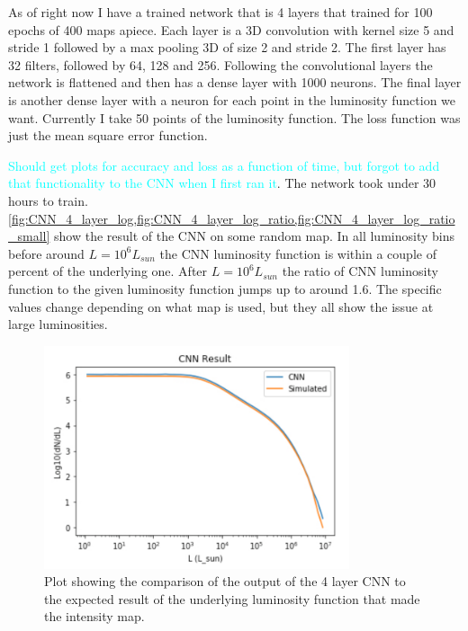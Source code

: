 \documentclass{article}
\newcommand{\dnp}[1]{\textcolor{cyan}{#1}}
\begin{document}
			As of right now I have a trained network that is 4 layers that trained for 100 epochs of 400 maps apiece.  Each layer is a 3D convolution with kernel size 5 and stride 1 followed by a max pooling 3D of size 2 and stride 2.  The first layer has 32 filters, followed by 64, 128 and 256.  Following the convolutional layers the network is flattened and then has a dense layer with 1000 neurons.  The final layer is another dense layer with a neuron for each point in the luminosity function we want.  Currently I take 50 points of the luminosity function.  The loss function was just the mean square error function.

			\dnp{Should get plots for accuracy and loss as a function of time, but forgot to add that functionality to the CNN when I first ran it}.  The network took under 30 hours to train.  \cref{fig:CNN_4_layer_log,fig:CNN_4_layer_log_ratio,fig:CNN_4_layer_log_ratio_small} show the result of the CNN on some random map.  In all luminosity bins before around \(L = 10^6 L_{sun}\) the CNN luminosity function is within a couple of percent of the underlying one.  After \(L = 10^6 L_{sun}\) the ratio of CNN luminosity function to the given luminosity function jumps up to around 1.6.  The specific values change depending on what map is used, but they all show the issue at large luminosities.

			\begin{figure}[H]
				\centering 
				\includegraphics[width=0.8\textwidth]{CNN_4_layer_log.pdf}
				\caption{Plot showing the comparison of the output of the 4 layer CNN to the expected result of the underlying luminosity function that made the intensity map.}
				\label{fig:CNN_4_layer_log}
			\end{figure}
\end{document}
